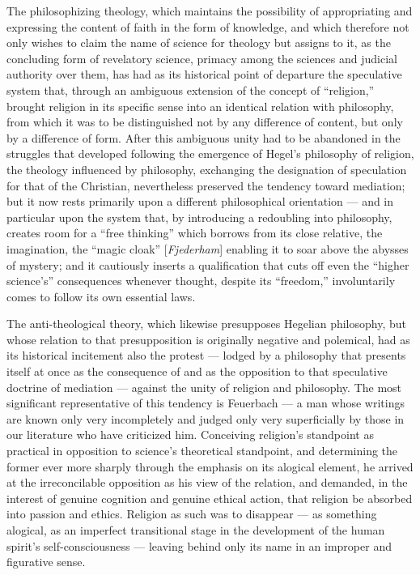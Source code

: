 \documentclass[12pt,a4paper]{article}
\begin{document}
The philosophizing theology, which maintains the possibility of
appropriating and expressing the content of faith in the form of
knowledge, and which therefore not only wishes to claim the name of
science for theology but assigns to it, as the concluding form of
revelatory science, primacy among the sciences and judicial authority
over them, has had as its historical point of departure the speculative
system that, through an ambiguous extension of the concept of
``religion,'' brought religion in its specific sense into an identical
relation with philosophy, from which it was to be distinguished not by
any difference of content, but only by a difference of form. After
this ambiguous unity had to be abandoned in the struggles that
developed following the emergence of Hegel's philosophy of religion,
the theology influenced by philosophy, exchanging the designation of
speculation for that of the Christian, nevertheless preserved the
tendency toward mediation; but it now rests primarily upon a different
philosophical orientation --- and in particular upon the system that,
by introducing a redoubling into philosophy, creates room for a ``free
thinking'' which borrows from its close relative, the imagination, the
``magic cloak'' [\textit{Fjederham}] enabling it to soar above the
abysses of mystery; and it cautiously inserts a qualification that cuts
off even the ``higher science's'' consequences whenever thought,
despite its ``freedom,'' involuntarily comes to follow its own
essential laws.

The anti-theological theory, which likewise presupposes Hegelian
philosophy, but whose relation to that presupposition is originally
negative and polemical, had as its historical incitement also the
protest --- lodged by a philosophy that presents itself at once as the
consequence of and as the opposition to that speculative doctrine of
mediation --- against the unity of religion and philosophy. The most
significant representative of this tendency is Feuerbach --- a man
whose writings are known only very incompletely and judged only very
superficially by those in our literature who have criticized him.
Conceiving religion's standpoint as practical in opposition to
science's theoretical standpoint, and determining the former ever more
sharply through the emphasis on its alogical element, he arrived at
the irreconcilable opposition as his view of the relation, and
demanded, in the interest of genuine cognition and genuine ethical
action, that religion be absorbed into passion and ethics. Religion as
such was to disappear --- as something alogical, as an imperfect
transitional stage in the development of the human spirit's
self-consciousness --- leaving behind only its name in an improper and
figurative sense.
\end{document}

